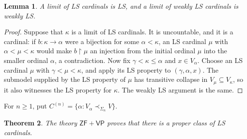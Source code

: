 \documentclass[11pt,a4paper]{amsart}
\newcommand{\VP}{\mathsf{VP}}
\newcommand{\ZF}{\mathsf{ZF}}
\newcommand{\restr}{\mathbin{\upharpoonright}}
\theoremstyle{plain}
\newtheorem{theorem}{Theorem}[section]
\newtheorem{lemma}[theorem]{Lemma}
\theoremstyle{definition}
\theoremstyle{remark}
\begin{document}
\begin{lemma}\label{lem:limits-LS}
A limit of LS cardinals is LS, and a limit of weakly LS cardinals is weakly LS.
\end{lemma}

\begin{proof}
\begingroup

Suppose that $\kappa$ is a limit of LS cardinals.  It is uncountable, and it is a cardinal: if $b:\kappa\to\alpha$ were a bijection for some $\alpha<\kappa$, an LS cardinal $\mu$ with $\alpha<\mu<\kappa$ would make $b\restr\mu$ an injection from the initial ordinal $\mu$ into the smaller ordinal $\alpha$, a contradiction.  Now fix $\gamma<\kappa\leq\alpha$ and $x\in V_\alpha$.  Choose an LS cardinal $\mu$ with $\gamma<\mu<\kappa$, and apply its LS property to $(\gamma,\alpha,x)$.  The submodel supplied by the LS property of $\mu$ has transitive collapse in $V_\mu\subseteq V_\kappa$, so it also witnesses the LS property for $\kappa$.  The weakly LS argument is the same.
\endgroup
\end{proof}

For $n\geq1$, put $C^{(n)}=\{\alpha:V_\alpha\prec_{\Sigma_n}V\}$.

\begin{theorem}\label{thm:Vopenka-LS}
The theory $\ZF+\VP$ proves that there is a proper class of LS cardinals.
\end{theorem}
\end{document}
